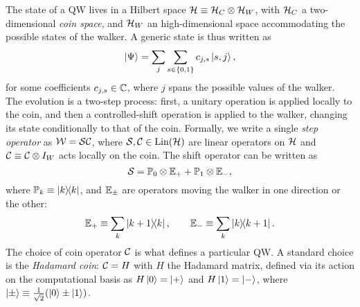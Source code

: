 The state of a QW lives in a Hilbert space ${\mathcal{H}}\equiv{\mathcal{H}}_C\otimes{\mathcal{H}}_W$, with ${\mathcal{H}}_C$ a two-dimensional \emph{coin space}, and ${\mathcal{H}}_W$ an high-dimensional space accommodating the possible states of the walker.
A generic state is thus written as
\begin{equation}
    \ket\Psi = \sum_j \sum_{s\in\{0,1\}} c_{j,s} \ket{s, j},
\end{equation}
for some coefficients $c_{j,s}\in{\mathbb{C}}$, where $j$ spans the possible values of the walker.
The evolution is a two-step process:
first, a unitary operation is applied locally to the coin,
and then a controlled-shift operation is applied to the walker, changing its state conditionally to that of the coin.
Formally, we write a single \textit{step operator} as ${\mathcal{W}}={\mathcal{S}}{\mathcal{C}}$, where ${\mathcal{S}},{\mathcal{C}}\in\operatorname{Lin}({\mathcal{H}})$ are linear operators on ${\mathcal{H}}$ and ${\mathcal{C}}\equiv{\mathcal{C}}\otimes I_W$ acts locally on the coin. The shift operator can be written as
\begin{equation}
    {\mathcal{S}} = {\mathbb{P}}_0\otimes {\mathbb{E}}_+ + {\mathbb{P}}_1\otimes {\mathbb{E}}_-,
    \label{eq:qws_shitty_definition_cshift}
\end{equation}
where ${\mathbb{P}}_k\equiv\ketbra k$, and ${\mathbb{E}}_\pm$ are operators moving the walker in one direction or the other:
\begin{equation}
    {\mathbb{E}}_+\equiv \sum_k \ketbra{k+1}{k},
    \qquad
    {\mathbb{E}}_-\equiv\sum_k\ketbra{k}{k+1}.
\end{equation}
The choice of coin operator ${\mathcal{C}}$ is what defines a particular \ac{QW}.
A standard choice is the \textit{Hadamard coin}: ${\mathcal{C}}=H$ with $H$ the Hadamard matrix, defined via its action on the computational basis as
$H\ket0=\ket+$ and $H\ket1=\ket-$, where $\ket\pm\equiv\frac{1}{\sqrt2}(\ket0\pm\ket1)$.

